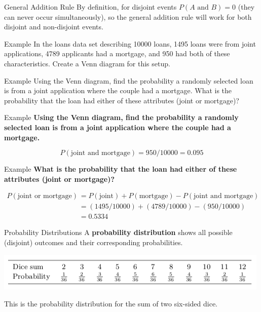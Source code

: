 \begin{frame}{General Addition Rule}
    By definition, for disjoint events $P(A \text{ and } B)=0$ (they can never occur simultaneously), so the general addition rule will work for both disjoint and non-disjoint events.
\end{frame}

\begin{frame}{Example}
    In the loans data set describing 10000 loans, 1495 loans were from joint applications, 4789 applicants had a mortgage, and 950 had both of these characteristics. Create a Venn diagram for this setup.
\end{frame}

\begin{frame}{Example}
    Using the Venn diagram, find the probability a randomly selected loan is from a joint application where the couple had a mortgage. What is the probability that the loan had either of these attributes (joint or mortgage)?
\end{frame}

\begin{frame}{Example}
    \textbf{Using the Venn diagram, find the probability a randomly selected loan is from a joint application where the couple had a mortgage.}
    
    \vspace{12pt}\[P(\text{joint and mortgage}) = 950/10000 = 0.095\]
\end{frame}

\begin{frame}{Example}
    \textbf{What is the probability that the loan had either of these attributes (joint or mortgage)?}
    
    \vspace{12pt}\begin{align*}
        P(\text{joint or mortgage}) &= P(\text{joint}) + P(\text{mortgage}) - P(\text{joint and mortgage}) \\
        &= (1495/10000)+(4789/10000)-(950/10000) \\
        &= 0.5334
    \end{align*}
\end{frame}

\begin{frame}{Probability Distributions}
    A \textbf{probability distribution} shows all possible (disjoint) outcomes and their corresponding probabilities.
    
    \vspace{12pt}\begin{center}
        \includegraphics[scale=0.5]{images/sum2d6.png}
    \end{center}
    This is the probability distribution for the sum of two six-sided dice.
\end{frame}


